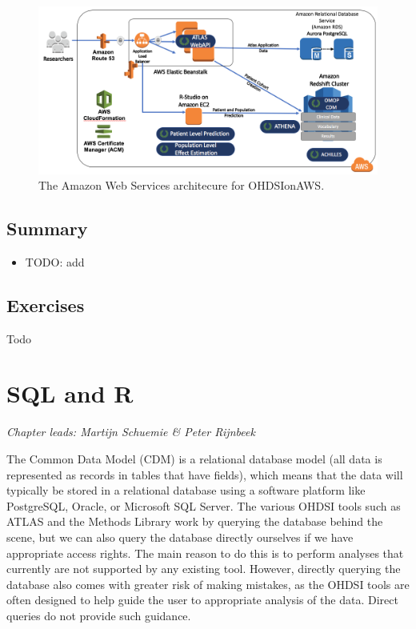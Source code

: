 \documentclass[11pt]{book}
\providecommand{\tightlist}{%
  \setlength{\itemsep}{0pt}\setlength{\parskip}{0pt}}
\theoremstyle{definition}
\theoremstyle{definition}
\theoremstyle{definition}
\theoremstyle{remark}
\let\BeginKnitrBlock\begin \let\EndKnitrBlock\end
\begin{document}
\begin{figure}

{\centering \includegraphics[width=1\linewidth]{images/OhdsiAnalyticsTools/OHDSIonAWSDiagram} 

}

\caption{The Amazon Web Services architecure for OHDSIonAWS.}\label{fig:ohdsionawsDiagram}
\end{figure}

\hypertarget{summary-5}{%
\section{Summary}\label{summary-5}}

\BeginKnitrBlock{rmdsummary}
\begin{itemize}
\tightlist
\item
  TODO: add
\end{itemize}
\EndKnitrBlock{rmdsummary}

\hypertarget{exercises}{%
\section{Exercises}\label{exercises}}

Todo

\hypertarget{SqlAndR}{%
\chapter{SQL and R}\label{SqlAndR}}

\emph{Chapter leads: Martijn Schuemie \& Peter Rijnbeek}

The Common Data Model (CDM) is a relational database model (all data is represented as records in tables that have fields), which means that the data will typically be stored in a relational database using a software platform like PostgreSQL, Oracle, or Microsoft SQL Server. The various OHDSI tools such as ATLAS and the Methods Library work by querying the database behind the scene, but we can also query the database directly ourselves if we have appropriate access rights. The main reason to do this is to perform analyses that currently are not supported by any existing tool. However, directly querying the database also comes with greater risk of making mistakes, as the OHDSI tools are often designed to help guide the user to appropriate analysis of the data. Direct queries do not provide such guidance.
\end{document}
